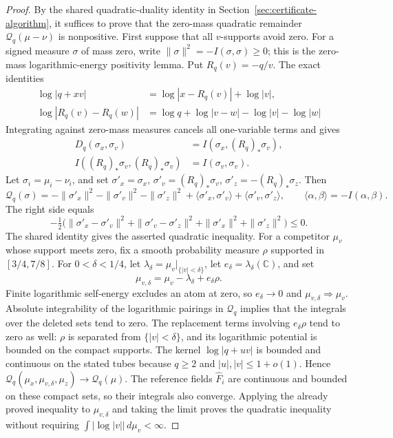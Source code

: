 \begin{proof}
By the shared quadratic-duality identity in
Section~\ref{sec:certificate-algorithm}, it suffices to prove that the
zero-mass quadratic remainder $\mathcal Q_q(\mu-\nu)$ is nonpositive.
First suppose that all $v$-supports avoid zero.  For a signed measure
$\sigma$ of mass zero, write $\|\sigma\|^2=-I(\sigma,\sigma)\ge0$;
this is the zero-mass logarithmic-energy positivity lemma.  Put
$R_q(v)=-q/v$.  The exact identities
\begin{align*}
 \log|q+xv|&=\log|x-R_q(v)|+\log|v|,\\
 \log|R_q(v)-R_q(w)|&=\log q+\log|v-w|-\log|v|-\log|w|
\end{align*}
Integrating against zero-mass measures cancels all one-variable terms and
gives
\begin{align*}
 D_q(\sigma_x,\sigma_v)&=I(\sigma_x,(R_q)_*\sigma_v),\\
 I((R_q)_*\sigma_v,(R_q)_*\sigma_v)&=I(\sigma_v,\sigma_v).
\end{align*}
Let $\sigma_i=\mu_i-\nu_i$, and set
$\sigma'_x=\sigma_x$, $\sigma'_v=(R_q)_*\sigma_v$,
$\sigma'_z=-(R_q)_*\sigma_z$.  Then
\[
 \mathcal Q_q(\sigma)
 =-\|\sigma'_x\|^2-\|\sigma'_v\|^2-\|\sigma'_z\|^2
   +\langle\sigma'_x,\sigma'_v\rangle
   +\langle\sigma'_v,\sigma'_z\rangle,
 \qquad \langle\alpha,\beta\rangle=-I(\alpha,\beta).
\]
The right side equals
\[
 -\tfrac12\bigl(\|\sigma'_x-\sigma'_v\|^2
              +\|\sigma'_v-\sigma'_z\|^2
              +\|\sigma'_x\|^2+\|\sigma'_z\|^2\bigr)\le0.
\]
The shared identity gives the asserted quadratic inequality.  For a
competitor $\mu_v$ whose support meets zero, fix a smooth probability
measure $\rho$ supported in $[3/4,7/8]$.  For $0<\delta<1/4$, let
$\lambda_\delta=\mu_v|_{\{|v|<\delta\}}$, let
$e_\delta=\lambda_\delta(\mathbb C)$, and set
\[
 \mu_{v,\delta}=\mu_v-\lambda_\delta+e_\delta\rho.
\]
Finite logarithmic self-energy excludes an atom at zero, so
$e_\delta\to0$ and $\mu_{v,\delta}\Rightarrow\mu_v$.  Absolute
integrability of the logarithmic pairings in $\mathcal Q_q$ implies that
the integrals over the deleted sets tend to zero.  The replacement terms
involving $e_\delta\rho$ tend to zero as well: $\rho$ is separated from
$\{|v|<\delta\}$, and its logarithmic potential is bounded on the compact
supports.  The kernel $\log|q+uv|$ is bounded and continuous on the stated
tubes because $q\ge2$ and $|u|,|v|\le1+o(1)$.  Hence
$\mathcal Q_q(\mu_{x},\mu_{v,\delta},\mu_z)\to\mathcal Q_q(\mu)$.
The reference fields $\widehat F_i$ are continuous and bounded on these
compact sets, so their integrals also converge.  Applying the already
proved inequality to $\mu_{v,\delta}$ and taking the limit proves the
quadratic inequality without requiring $\int|\log|v||\,d\mu_v<\infty$.


\end{proof}
